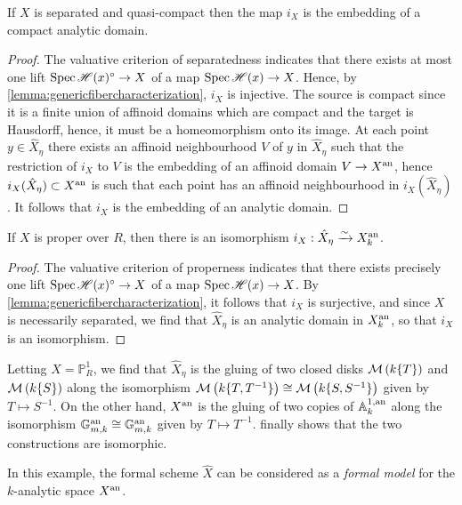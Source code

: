 \begin{theorem}\label{separatedix}
If $X$ is separated and quasi-compact then the map $i_X$ is the embedding of a compact analytic domain.
\end{theorem}
\begin{proof}
The valuative criterion of separatedness indicates that there exists at most one lift $\operatorname{Spec}{\mathscr{H}(x)^{\circ}} \to X$ of a map $\operatorname{Spec}{\mathscr{H}(x)} \to X$. 
Hence, by \cref{lemma:genericfibercharacterization}, $i_X$ is injective. 
The source is compact since it is a finite union of affinoid domains which are compact and the target is Hausdorff, hence, it must be a homeomorphism onto its image.
At each point $y \in \hat{X}_{\eta}$ there exists an affinoid neighbourhood $V$ of $y$ in $\hat{X}_{\eta}$ such that the restriction of $i_X$ to $V$ is the embedding of an affinoid domain $V \to X^{\text{an}}$, hence $i_X(\hat{X}_{\eta}) \subset X^{\text{an}}$ is such that each point has an affinoid neighbourhood in $i_X(\hat{X}_{\eta})$.
It follows that $i_X$ is the embedding of an analytic domain.
\end{proof}

\begin{corollary} \label{properisiso}
If $X$ is proper over $R$, then there is an isomorphism $i_X: \hat{X}_\eta \xrightarrow{\sim} X_k^{\text{an}}$.
\end{corollary}
\begin{proof}
The valuative criterion of properness indicates that there exists precisely one lift $\operatorname{Spec}{\mathscr{H}(x)^{\circ}} \to X$ of a map $\operatorname{Spec}{\mathscr{H}(x)} \to X$. 
By \cref{lemma:genericfibercharacterization}, it follows that $i_X$ is surjective, and since $X$ is necessarily separated, we find that $\hat{X}_\eta$ is an analytic domain in $X^{\text{an}}_k$, so that $i_X$ is an isomorphism.
\end{proof}

Letting $X = \mathbb{P}^{1}_{R}$, we find that $\hat{X}_{\eta}$ is the gluing of two closed disks $\mathcal{M}\left(k\{T\}\right)$ and $\mathcal{M}\left(k\{S\}\right)$ along the isomorphism $\mathcal{M}\left(k\{T, T^{-1}\}\right) \cong \mathcal{M}\left(k\{S, S^{-1}\}\right)$ given by $T \mapsto S^{-1}$.
On the other hand, $X^{\text{an}}$ is the gluing of two copies of $\mathbb{A}^{1, \text{an}}_{k}$ along the isomorphism $\mathbb{G}_{m, k}^{\text{an}} \cong \mathbb{G}_{m, k}^{\text{an}}$ given by $T \mapsto T^{-1}$.
 finally shows that the two constructions are isomorphic.

In this example, the formal scheme $\hat{X}$ can be considered as a \textit{formal model} for the $k$-analytic space $X^{\text{an}}$.

